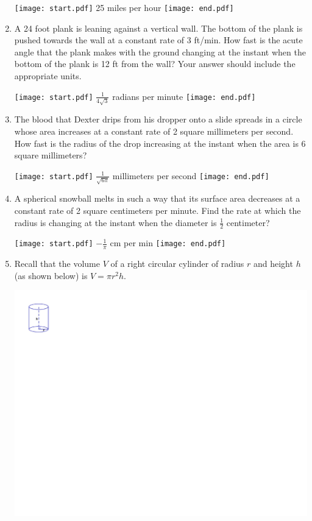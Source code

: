 \documentclass[12pt]{article}
\begin{document}
\begin{enumerate}
\texttt{[image: start.pdf]}
{{25 miles per hour}}
\texttt{[image: end.pdf]}


\item A 24 foot plank is leaning against a vertical wall.  The bottom of the plank is pushed towards the wall at a constant rate of 3 ft/min.  How fast is the acute angle that the plank makes with the ground changing at the instant when the bottom of the plank is 12 ft from the wall?  Your answer should include the appropriate units.

\texttt{[image: start.pdf]}
{{$\frac{1}{4\sqrt{3}}$ radians per minute}}
\texttt{[image: end.pdf]}


\item The blood that Dexter drips from his dropper onto a slide spreads in a circle whose area increases at a constant rate of 2 square millimeters per second.  How fast is the radius of the drop increasing at the instant when the area is 6 square millimeters? 

\texttt{[image: start.pdf]}
{{$\frac{1}{\sqrt{6\pi}}$ millimeters per second}}
\texttt{[image: end.pdf]}


\item A spherical snowball melts in such a way that its surface area decreases at a constant rate of 2 square centimeters per minute.  Find the rate at which the radius is changing at the instant when the diameter is $\frac{1}{2}$ centimeter?

\texttt{[image: start.pdf]}
{{$-\frac{1}{\pi}$ cm per min}}
\texttt{[image: end.pdf]}


\item Recall that the volume $V$ of a right circular cylinder of radius $r$ and height $h$ (as shown below) is $V=\pi r^2h$.

\begin{center}
\includegraphics[scale=1]{cylinder.pdf}
\end{center}


\end{enumerate}
\end{document}
